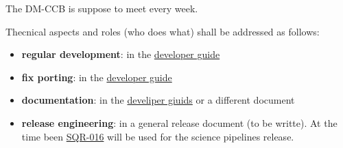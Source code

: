 The DM-CCB is suppose to meet every week.

Thecnical aspects and roles (who does what) shall be addressed as follows:

\begin{itemize}
\item {\bf regular development}: in the \href{https://developer.lsst.io/}{developer guide}
\item {\bf fix porting}: in the \href{https://developer.lsst.io/}{developer guide}
\item {\bf documentation}: in the \href{https://developer.lsst.io/}{develiper giuids} or a different document
\item {\bf release engineering}: in a general release document (to be writte). At the time been \href{https://sqr-016.lsst.io/}{SQR-016} will be used for the science pipelines release.
\end{itemize}


